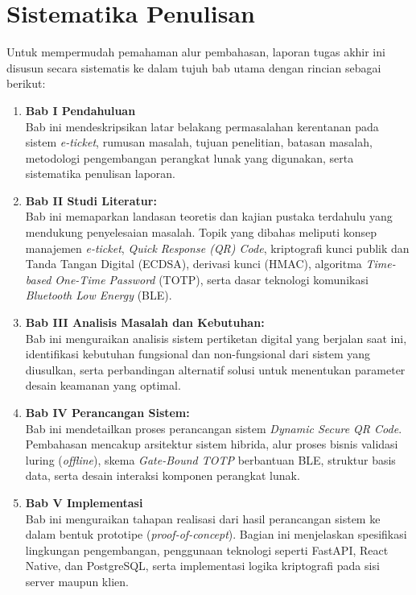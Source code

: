 \section{Sistematika Penulisan}
Untuk mempermudah pemahaman alur pembahasan, laporan tugas akhir ini disusun secara sistematis ke dalam tujuh bab utama dengan rincian sebagai berikut:

\begin{enumerate}
\item	\textbf{Bab I Pendahuluan} \\
Bab ini mendeskripsikan latar belakang permasalahan kerentanan pada sistem \textit{e-ticket}, rumusan masalah, tujuan penelitian, batasan masalah, metodologi pengembangan perangkat lunak yang digunakan, serta sistematika penulisan laporan.
\item	\textbf{Bab II Studi Literatur:} \\
Bab ini memaparkan landasan teoretis dan kajian pustaka terdahulu yang mendukung penyelesaian masalah. Topik yang dibahas meliputi konsep manajemen \textit{e-ticket}, \textit{Quick Response (QR) Code}, kriptografi kunci publik dan Tanda Tangan Digital (ECDSA), derivasi kunci (HMAC), algoritma \textit{Time-based One-Time Password} (TOTP), serta dasar teknologi komunikasi \textit{Bluetooth Low Energy} (BLE).
\item	\textbf{Bab III Analisis Masalah dan Kebutuhan:} \\
Bab ini menguraikan analisis sistem pertiketan digital yang berjalan saat ini, identifikasi kebutuhan fungsional dan non-fungsional dari sistem yang diusulkan, serta perbandingan alternatif solusi untuk menentukan parameter desain keamanan yang optimal.
\item   \textbf{Bab IV Perancangan Sistem:} \\
Bab ini mendetailkan proses perancangan sistem \textit{Dynamic Secure QR Code}. Pembahasan mencakup arsitektur sistem hibrida, alur proses bisnis validasi luring (\textit{offline}), skema \textit{Gate-Bound TOTP} berbantuan BLE, struktur basis data, serta desain interaksi komponen perangkat lunak.
\item	\textbf{Bab V Implementasi} \\
Bab ini menguraikan tahapan realisasi dari hasil perancangan sistem ke dalam bentuk prototipe (\textit{proof-of-concept}). Bagian ini menjelaskan spesifikasi lingkungan pengembangan, penggunaan teknologi seperti FastAPI, React Native, dan PostgreSQL, serta implementasi logika kriptografi pada sisi server maupun klien.

\end{enumerate}
